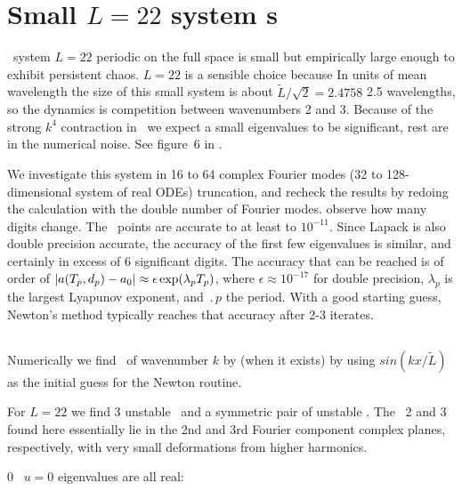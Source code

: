 %


\section{Small $L=22$ system {\rpo s}}

\KS\ system $L = 22$ periodic on the full space is small but empirically 
large enough to exhibit persistent chaos.  $L=22$ is a sensible choice 
because In units of mean wavelength the size of this small system is about 
$ \tilde{L}/\sqrt{2}= 2.4758$ 2.5 wavelengths, so the dynamics is 
competition between wavenumbers 2 and 3. Because of the strong $k^4$ 
contraction in \KS\ we expect a small eigenvalues to be significant, rest 
are in the numerical noise. See figure~6 in .

 We investigate this system in 16 to 64 complex Fourier modes (32 to 
128-dimensional system of real ODEs) truncation, and recheck the results 
by redoing the calculation with the double number of Fourier modes. %
observe how many digits change. The \eqv\ points are accurate to at least 
to $10^{-11}$. Since Lapack is also double precision accurate, the 
accuracy of the first few eigenvalues is similar, and certainly in excess 
of 6 significant digits. %
The accuracy that can be reached is of order of 
$|a({T_{p}},d_p) - a_0| 
 \approx \epsilon \exp(\lambda_p {T_{p}})$, 
 where $\epsilon \approx 10^{-17}$ for double precision, $\lambda_p$ is 
the largest Lyapunov exponent, and $\period{p}$ the period.  With a good 
starting guess, Newton's method typically reaches that accuracy after 2-3 
iterates.

\subsection{\Eqva}

Numerically we find \eqv\ of wavenumber $k$ by (when it exists)
by using $sin( k x /\tilde{L})$ as the initial guess for the Newton routine.

For $L = 22$ we find
3 unstable \eqva\ and a symmetric pair of unstable \reqva.
The \eqva\ {\nameit}2 and {\nameit}3 found here
essentially lie in the 2nd and 3rd Fourier component complex planes,
respectively, with very
small deformations from higher harmonics.

{\nameit}0 \eqv\  $u=0$ eigenvalues are all real:

